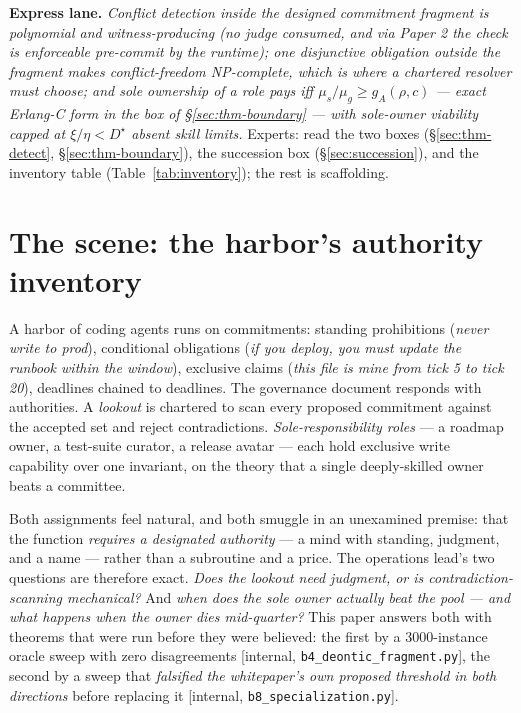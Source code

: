 \documentclass[11pt,a4paper]{article}
\begin{document}
\vspace{0.5em} \noindent\textbf{Express lane.} \emph{Conflict detection inside the designed commitment fragment is polynomial and
witness-producing (no judge consumed, and via Paper 2 the check is enforceable pre-commit by the runtime); one disjunctive
obligation outside the fragment makes conflict-freedom NP-complete, which is where a chartered resolver must choose; and sole
ownership of a role pays iff $\mu_s/\mu_g \ge g_A(\rho,c)$ --- exact Erlang-C form in the box of \S\ref{sec:thm-boundary} --- with
sole-owner viability capped at $\xi/\eta < D^\star$ absent skill limits.} Experts: read the two boxes
(\S\ref{sec:thm-detect}, \S\ref{sec:thm-boundary}), the succession box (\S\ref{sec:succession}), and the inventory table
(Table~\ref{tab:inventory}); the rest is scaffolding.

\section{The scene: the harbor's authority inventory}\label{sec:scene}
A harbor of coding agents runs on commitments: standing prohibitions (\emph{never write to prod}), conditional obligations
(\emph{if you deploy, you must update the runbook within the window}), exclusive claims (\emph{this file is mine from tick 5 to
tick 20}), deadlines chained to deadlines. The governance document responds with authorities. A \emph{lookout} is chartered to
scan every proposed commitment against the accepted set and reject contradictions. \emph{Sole-responsibility roles} --- a roadmap
owner, a test-suite curator, a release avatar --- each hold exclusive write capability over one invariant, on the theory that a
single deeply-skilled owner beats a committee.

Both assignments feel natural, and both smuggle in an unexamined premise: that the function \emph{requires a designated authority}
--- a mind with standing, judgment, and a name --- rather than a subroutine and a price. The operations lead's two questions are
therefore exact. \emph{Does the lookout need judgment, or is contradiction-scanning mechanical?} And \emph{when does the sole
owner actually beat the pool --- and what happens when the owner dies mid-quarter?} This paper answers both with theorems that were
run before they were believed: the first by a 3000-instance oracle sweep with zero disagreements [internal,
\texttt{b4\_deontic\_fragment.py}], the second by a sweep that \emph{falsified the whitepaper's own proposed threshold in both
directions} before replacing it [internal, \texttt{b8\_specialization.py}].
\end{document}

